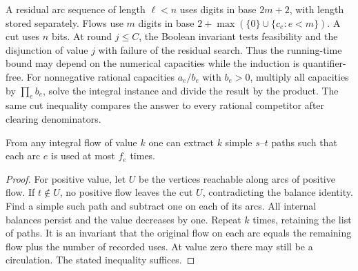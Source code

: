 A residual arc sequence of length $\ell<n$ uses digits in base $2m+2$,
with length stored separately. Flows use $m$ digits in base
$2+\max(\{0\}\cup\{c_e:e<m\})$. A cut uses $n$ bits. At round
$j\le C$, the Boolean invariant tests feasibility and the disjunction
of value $j$ with failure of the residual search. Thus the running-time
bound may depend on the numerical capacities while the induction is
quantifier-free. For nonnegative rational capacities $a_e/b_e$ with
$b_e>0$, multiply all capacities by $\prod_e b_e$, solve the integral
instance and divide the result by the product. The same cut inequality
compares the answer to every rational competitor after clearing
denominators.

\begin{lemma}\leavevmode\label{fl:decompose}
From any integral flow of value $k$ one can extract $k$ simple
$s$--$t$ paths such that each arc $e$ is used at most $f_e$ times.
\end{lemma}
\begin{proof}
For positive value, let $U$ be the vertices reachable along arcs of
positive flow. If $t\notin U$, no positive flow leaves the cut $U$,
contradicting the balance identity. Find a simple such path and
subtract one on each of its arcs. All internal balances persist and
the value decreases by one. Repeat $k$ times, retaining the list of
paths. It is an invariant that the original flow on each arc equals
the remaining flow plus the number of recorded uses. At value zero
there may still be a circulation. The stated inequality suffices.
\end{proof}

